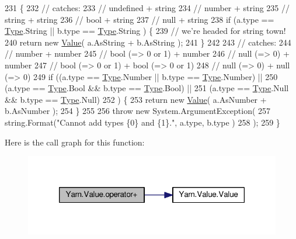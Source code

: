 \begin{DoxyCode}
231                                                          \{
232             \textcolor{comment}{// catches:}
233             \textcolor{comment}{// undefined + string}
234             \textcolor{comment}{// number + string}
235             \textcolor{comment}{// string + string}
236             \textcolor{comment}{// bool + string}
237             \textcolor{comment}{// null + string}
238             \textcolor{keywordflow}{if} (a.type == \hyperlink{a00181_ad5aaf60ee4504608fcc2ffadefa14884}{Type}.String || b.type == \hyperlink{a00181_ad5aaf60ee4504608fcc2ffadefa14884}{Type}.String ) \{
239                 \textcolor{comment}{// we're headed for string town!}
240                 \textcolor{keywordflow}{return} \textcolor{keyword}{new} \hyperlink{a00181_a7d2db75682c57463bf43c13499991ad4}{Value}( a.AsString + b.AsString );
241             \}
242 
243             \textcolor{comment}{// catches:}
244             \textcolor{comment}{// number + number}
245             \textcolor{comment}{// bool (=> 0 or 1) + number}
246             \textcolor{comment}{// null (=> 0) + number}
247             \textcolor{comment}{// bool (=> 0 or 1) + bool (=> 0 or 1)}
248             \textcolor{comment}{// null (=> 0) + null (=> 0)}
249             \textcolor{keywordflow}{if} ((a.type == \hyperlink{a00181_ad5aaf60ee4504608fcc2ffadefa14884}{Type}.Number || b.type == \hyperlink{a00181_ad5aaf60ee4504608fcc2ffadefa14884}{Type}.Number) ||
250                 (a.type == \hyperlink{a00181_ad5aaf60ee4504608fcc2ffadefa14884}{Type}.Bool && b.type == \hyperlink{a00181_ad5aaf60ee4504608fcc2ffadefa14884}{Type}.Bool) ||
251                 (a.type == \hyperlink{a00181_ad5aaf60ee4504608fcc2ffadefa14884}{Type}.Null && b.type == \hyperlink{a00181_ad5aaf60ee4504608fcc2ffadefa14884}{Type}.Null)
252             ) \{
253                 \textcolor{keywordflow}{return} \textcolor{keyword}{new} \hyperlink{a00181_a7d2db75682c57463bf43c13499991ad4}{Value}( a.AsNumber + b.AsNumber );
254             \}
255 
256             \textcolor{keywordflow}{throw} \textcolor{keyword}{new} System.ArgumentException(
257                 string.Format(\textcolor{stringliteral}{"Cannot add types \{0\} and \{1\}."}, a.type, b.type )
258             );
259         \}
\end{DoxyCode}


Here is the call graph for this function\-:
\nopagebreak
\begin{figure}[H]
\begin{center}
\leavevmode
\includegraphics[width=318pt]{a00181_abfd48481b0ac28ff5485a850a8271dfd_cgraph}
\end{center}
\end{figure}


